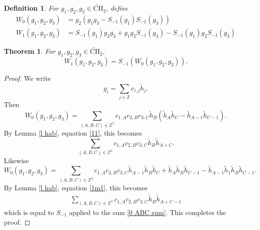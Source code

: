 \documentclass[11pt, oneside]{article}   	%
\newtheorem{theorem}{Theorem}
\newtheorem{definition}{Definition}
\newcommand{\ti}{\tilde{h}}
\newcommand{\tCH}{\tilde{\mathrm{CH}}_2}
\begin{document}
\begin{definition} 
For  $g_1,g_2,g_3 \in \tCH$, define 
\begin{align*}
W_0(g_1,g_2,g_3) &= g_2(g_1g_3 - S_{-1}(g_1)S_{-1}(g_3))\\ 
W_1(g_1,g_2,g_3) &= S_{-1}(g_1)g_2g_3+ g_1g_2S_{-1}(g_3) - S_{-1}(g_1)g_2S_{-1}(g_3)
\end{align*}
\end{definition} 

\begin{theorem} \label{t W}
For  $g_1,g_2,g_3 \in \tCH$,
\[
W_1(g_1,g_2,g_3) = S_{-1}(W_0(g_1,g_2,g_3)).
\]
\end{theorem} 
\begin{proof}
We write 
\[
g_i = \sum_{j \in \mathbb{Z}} c_{i,j} \ti_j.
\] 
Then 
\[
 W_0(g_1,g_2,g_3) = \sum_{(A,B,C) \in \mathbb{Z}^3} c_{1,A}c_{2,B}c_{3,C} \ti_B(\ti_A \ti_C  - \ti_{A-1}\ti_{C-1}).
\]
By Lemma \ref{l hab}, equation \eqref{11}, this becomes 
\begin{equation}\label{0 ABC sum}
\sum_{(A,B,C) \in \mathbb{Z}^3} c_{1,A}c_{2,B}c_{3,C} \ti_B \ti_{A+C}.
\end{equation}
Likewise 
 \[
 W_0(g_1,g_2,g_3)  = \sum_{(A,B,C) \in \mathbb{Z}^3} c_{1,A}c_{2,B}c_{3,C}  \ti_{A-1} \ti_B \ti_{C}  +\ti_{A} \ti_B \ti_{C-1} - \ti_{A-1} \ti_1 \ti_B \ti_{C-1}. 
 \]
By Lemma \ref{l hab}, equation \eqref{1m1}, this becomes 
\begin{align} \label{1 ABC sum}
\sum_{(A,B,C) \in \mathbb{Z}^3} c_{1,A}c_{2,B}c_{3,C}\ti_B \ti_{A+C-1} 
\end{align} 
which is equal to $S_{-1}$ applied to the sum \eqref{0 ABC sum}. This completes the proof. 
\end{proof}
\end{document}
